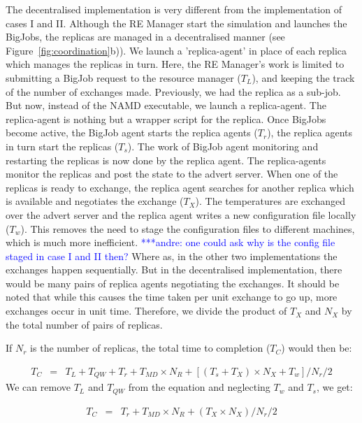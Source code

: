 \documentclass{rspublic}
\newcommand{\alnote}[1]{ {\textcolor{blue} { ***andre: #1 }}}
\newcommand{\alnote}[1]{}
\begin{document}
The decentralised implementation is very different from the implementation 
of cases I and II. Although the RE Manager start the simulation and launches 
the BigJobs, the replicas are managed in a decentralised manner (see Figure~\ref{fig:coordination}b)). We launch
a 'replica-agent' in place of each replica which manages the replicas in turn.
Here, the RE Manager's work is limited to submitting a BigJob request to the resource manager ($T_{L}$), and keeping the track of the number of exchanges made. Previously, we had the replica as a sub-job. But now, instead of the NAMD executable, we launch a replica-agent.
The replica-agent is nothing but a wrapper script for the replica. 
Once BigJobs become active, the BigJob agent starts the replica agents ($T_{r}$), the replica agents in turn start the replicas ($T_{s}$). The work of BigJob agent monitoring and restarting the replicas is now done by the replica agent. The replica-agents 
monitor the replicas and post the state to the advert server. When one of the 
replicas is ready to exchange, the replica agent searches for another replica which is 
available and negotiates the exchange ($T_{X}$).  The temperatures are exchanged over the advert server and the replica agent writes a new configuration file locally ($T_{w}$). This removes the need to stage the 
configuration files to different machines, which is much more inefficient. \alnote {one could ask why is the 
config file staged in case I and II then?} Where as, in the other two implementations the exchanges happen sequentially. But in the decentralised implementation, there would be many pairs of replica agents negotiating the exchanges. It should be noted that while this causes the time taken per unit exchange to go up, more exchanges occur in unit time. Therefore, we divide the product of $T_{X}$ and $N_{X}$ by the total number of pairs of replicas.

If $N_{r}$ is the number of replicas, the total time to completion ($T_{C}$) would then be: 

  \begin{eqnarray}
T_{C} &=& T_{L}+T_{QW}+T_{r}+T_{MD} \times N_{R} + [(T_{s} + T_{X}) \times N_{X}+T_{w}]/N_{r}/2
\label{eq:equation}
\end{eqnarray}
We can remove $T_{L}$ and $T_{QW}$ from the equation and neglecting $T_{w}$ and $T_{s}$, we get:

  \begin{eqnarray}
T_{C} &=&T_{r}+T_{MD} \times N_{R} + (T_{X} \times N_{X})/N_{r}/2
\label{eq:equation}
\end{eqnarray}
\end{document}
